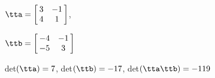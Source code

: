 {$\tta = \left[\hskip -3pt \begin{array}{cc} 3&-1\\  4&1\end {array} \hskip -3pt
 \right]$, 

$\ttb = \left[\hskip -3pt \begin{array}{cc} -4&-1\\  -5&3\end {array} \hskip -3pt
 \right]$}
{det$(\tta)=7$, det$(\ttb)=-17$, det$(\tta\ttb)=-119$}






  


